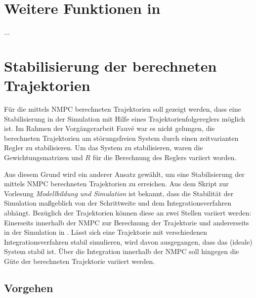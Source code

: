 \section{Weitere Funktionen in \Matlab}
...









\section{Stabilisierung der berechneten Trajektorien}\label{stabiltrj}

\newcommand{\scaleyplots}{0.6}

Für die mittels NMPC berechneten Trajektorien soll gezeigt werden, dass eine Stabilisierung in der Simulation mit Hilfe eines Trajektorienfolgereglers möglich ist. Im Rahmen der Vorgängerarbeit Fauvé \cite{fauve} war es nicht gelungen, die berechneten Trajektorien am störungsfreien System durch einen zeitvarianten Regler zu stabilisieren. Um das System zu stabilisieren, waren die Gewichtungsmatrizen  und $R$ für die Berechnung des Reglers variiert worden.

Aus diesem Grund wird ein anderer Ansatz gewählt, um eine Stabilisierung der mittels NMPC berechneten Trajektorien zu erreichen. Aus dem Skript \cite{modsim} zur Vorlesung \emph{Modellbildung und Simulation} ist bekannt, dass die Stabilität der Simulation maßgeblich von der Schrittweite und dem Integrationsverfahren abhängt. Bezüglich der Trajektorien können diese an zwei Stellen variiert werden: Einerseits innerhalb der NMPC zur Berechnung der Trajektorie und andererseits in der Simulation in \Simulink. Lässt sich eine Trajektorie mit verschiedenen Integrationsverfahren stabil simulieren, wird davon ausgegangen, dass das (ideale) System stabil ist. Über die Integration innerhalb der NMPC soll hingegen die Güte der berechneten Trajektorie variiert werden.


\subsection{Vorgehen}

